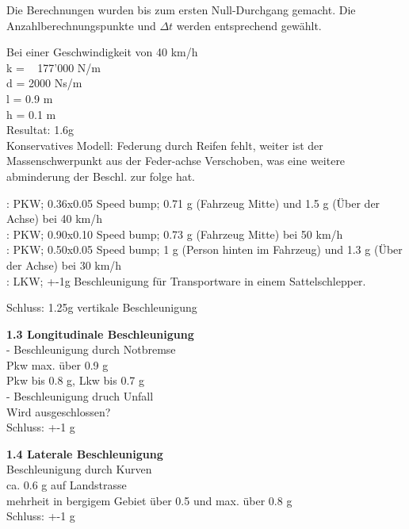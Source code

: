\begin{description}
  Die Berechnungen wurden bis zum ersten Null-Durchgang gemacht. Die Anzahlberechnungspunkte und $\Delta t$ werden entsprechend gewählt.

  Bei einer Geschwindigkeit von 40 km/h\\
  k = ~ 177'000 N/m\\
  d = 2000 Ns/m\\
  l = 0.9 m\\
  h = 0.1 m\\
  Resultat: 1.6g\\
  Konservatives Modell: Federung durch Reifen fehlt, weiter ist der Massenschwerpunkt aus der Feder-achse Verschoben, was eine weitere abminderung der Beschl. zur folge hat.

  \cite{Beschl.1}: PKW; 0.36x0.05 Speed bump; 0.71 g (Fahrzeug Mitte) und 1.5 g (Über der Achse) bei 40 km/h\\
  \cite{Beschl.2}: PKW; 0.90x0.10 Speed bump; 0.73 g (Fahrzeug Mitte) bei 50 km/h\\
  \cite{Beschl.3}: PKW; 0.50x0.05 Speed bump; 1 g (Person hinten im Fahrzeug) und 1.3 g (Über der Achse) bei 30 km/h\\
  \cite{Beschl.4}: LKW; +-1g Beschleunigung für Transportware in einem Sattelschlepper.

  Schluss: 1.25g vertikale Beschleunigung


  \item \textbf{1.3 Longitudinale Beschleunigung}\\
  - Beschleunigung durch Notbremse\\
  \cite{Verz.1} Pkw max. über 0.9 g\\
  \cite{Verz.2} Pkw bis 0.8 g, Lkw bis 0.7 g\\

  - Beschleunigung druch Unfall\\
  Wird ausgeschlossen?\\

  Schluss: +-1 g

  \item \textbf{1.4 Laterale Beschleunigung}\\
  Beschleunigung durch Kurven\\
  \cite{Kurv.1} ca. 0.6 g auf Landstrasse\\
  \cite{Kurv.2} mehrheit in bergigem Gebiet über 0.5 und max. über 0.8 g\\

  Schluss: +-1 g\\
\end{description}

